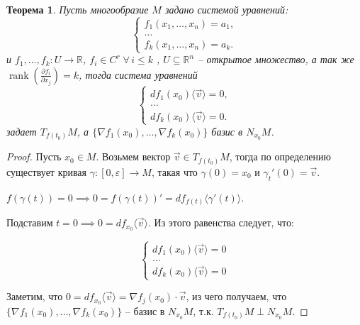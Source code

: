 \documentclass[a5paper]{article}
\newcounter{through}
\theoremstyle{plain}
\newtheorem{theorem}[through]{Теорема}
\theoremstyle{definition}
\numberwithin{through}{section}
\numberwithin{equation}{section}
\DeclareMathOperator{\rank}{rank}
\begin{document}
\begin{theorem}
	Пусть многообразие $M$ задано системой уравнений:
	\begin{equation*}
	\begin{cases}
	f_1(x_1, \ldots, x_n) = a_1,
	\\
	\ldots
	\\
	f_k(x_1, \ldots, x_n) = a_k.
	\end{cases}
	\end{equation*}
	и $f_1, \ldots, f_k : U \to \mathbb{R}$, $f_i \in C^r \; \forall \, i \leq k$ , $U \subseteq \mathbb{R}^n$ -- открытое множество, а так же $\rank (\frac{\partial f_i}{\partial x_j})=k$, тогда система уравнений
	\begin{equation*}
	\begin{cases}
	df_1(x_0)\langle\vec{v}\rangle = 0,
	\\
	\ldots
	\\
	df_k(x_0)\langle\vec{v}\rangle = 0.
	\end{cases}
	\end{equation*}
	задает $T_{f(t_0)}M$, а $\{\nabla f_1(x_0), \ldots, \nabla f_k(x_0)\}$ базис в $N_{x_0}M$.
\end{theorem}

\begin{proof}
	Пусть $x_0 \in M$. Возьмем вектор $\vec{v} \in T_{f(t_0)}M$, тогда по определению существует кривая $\gamma : [0, \varepsilon] \to M$, такая что $\gamma(0) = x_0$ и $\gamma_t'(0) = \vec{v}$.
	
	$f(\gamma(t)) = 0 \implies 0=f(\gamma(t))'=df_{f(t)}\langle\gamma'(t)\rangle$.
	
	Подставим $t=0 \implies 0 = df_{x_0}\langle\vec{v}\rangle$. Из этого равенства следует, что: 
	
	\begin{equation*}
	\begin{cases}
	df_1(x_0)\langle\vec{v}\rangle = 0
	\\
	\ldots
	\\
	df_k(x_0)\langle\vec{v}\rangle = 0
	\end{cases}
	\end{equation*}
	
	Заметим, что $0 = df_{x_0}\langle\vec{v}\rangle = \nabla f_j(x_0) \cdot \vec{v}$, из чего получаем, что 
	\\
	$\{\nabla f_1(x_0), \ldots, \nabla f_k(x_0)\}$ -- базис в $N_{x_0}M$, т.к. $T_{f(t_0)}M \perp N_{x_0}M$.
\end{proof}
\end{document}
